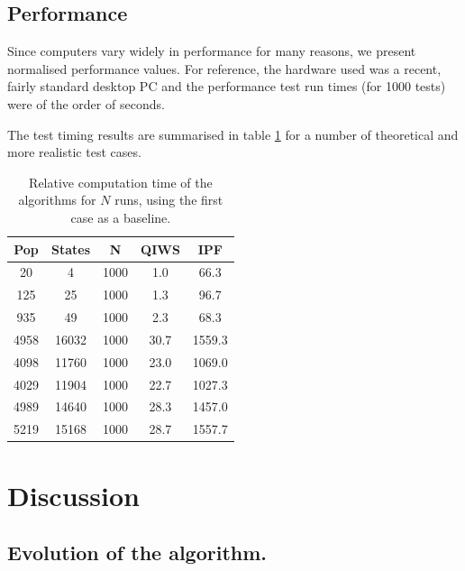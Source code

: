 \documentclass{JASSS}
\begin{document}
\subsection{Performance}\label{performance}

Since computers vary widely in performance for many reasons, we present
normalised performance values. For reference, the hardware used was a recent, fairly standard desktop PC and the performance test run times (for 1000 tests) were of the order of seconds.

The test timing results are summarised in table \ref{tab2} for a number of theoretical and more realistic test cases.



\begin{table}[!t]
	\centering
	\begin{tabular}{c|c|c|c|c}
	\toprule
	Pop & States & N & QIWS & IPF\tabularnewline
	\midrule
	20 & 4 & 1000 & 1.0 & 66.3\tabularnewline
	125 & 25 & 1000 & 1.3 & 96.7\tabularnewline
	935 & 49 & 1000 & 2.3 & 68.3\tabularnewline
	4958 & 16032 & 1000 & 30.7 & 1559.3\tabularnewline
	4098 & 11760 & 1000 & 23.0 & 1069.0\tabularnewline
	4029 & 11904 & 1000 & 22.7 & 1027.3\tabularnewline
	4989 & 14640 & 1000 & 28.3 & 1457.0\tabularnewline
	5219 & 15168 & 1000 & 28.7 & 1557.7\tabularnewline
	\bottomrule			
	\end{tabular}
	\caption{Relative computation time of the algorithms for \(N\) runs, using the first case as a baseline.}
	\label{tab2}	
\end{table}

\section{Discussion}\label{discussion}

\subsection{Evolution of the algorithm.}\label{evolution-of-the-algorithm.}

\end{document}
